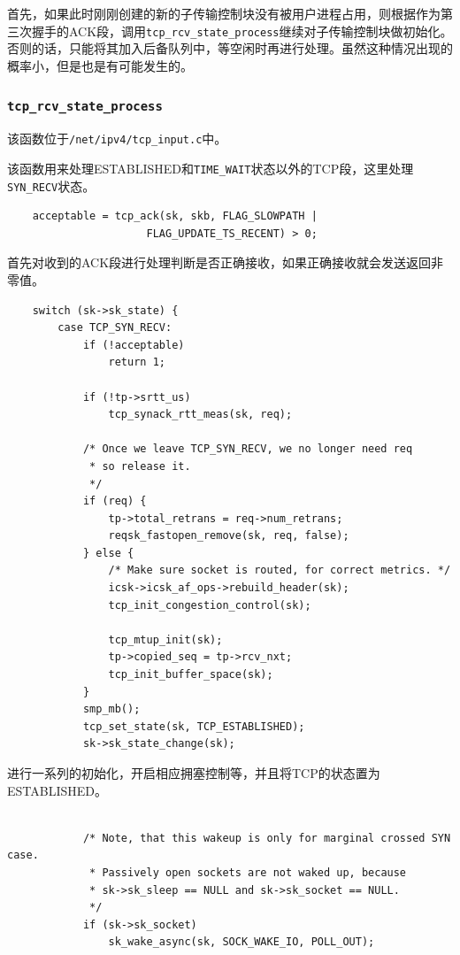                 首先，如果此时刚刚创建的新的子传输控制块没有被用户进程占用，则根据作为第三次握手的ACK段，调用\texttt{tcp_rcv_state_process}继续对子传输控制块做初始化。否则的话，只能将其加入后备队列中，等空闲时再进行处理。虽然这种情况出现的概率小，但是也是有可能发生的。

                \subsubsection{\texttt{tcp_rcv_state_process}}

                    该函数位于\texttt{/net/ipv4/tcp_input.c}中。
                    
                    该函数用来处理ESTABLISHED和\texttt{TIME_WAIT}状态以外的TCP段，这里处理\texttt{SYN_RECV}状态。

\begin{verbatim}
    acceptable = tcp_ack(sk, skb, FLAG_SLOWPATH |
                      FLAG_UPDATE_TS_RECENT) > 0;
\end{verbatim}

                    首先对收到的ACK段进行处理判断是否正确接收，如果正确接收就会发送返回非零值。

\begin{verbatim}
    switch (sk->sk_state) {
        case TCP_SYN_RECV:
            if (!acceptable)
                return 1;

            if (!tp->srtt_us)
                tcp_synack_rtt_meas(sk, req);

            /* Once we leave TCP_SYN_RECV, we no longer need req
             * so release it.
             */
            if (req) {
                tp->total_retrans = req->num_retrans;
                reqsk_fastopen_remove(sk, req, false);
            } else {
                /* Make sure socket is routed, for correct metrics. */
                icsk->icsk_af_ops->rebuild_header(sk);
                tcp_init_congestion_control(sk);

                tcp_mtup_init(sk);
                tp->copied_seq = tp->rcv_nxt;
                tcp_init_buffer_space(sk);
            }
            smp_mb();
            tcp_set_state(sk, TCP_ESTABLISHED);
            sk->sk_state_change(sk);
\end{verbatim}

                    进行一系列的初始化，开启相应拥塞控制等，并且将TCP的状态置为ESTABLISHED。

\begin{verbatim}

            /* Note, that this wakeup is only for marginal crossed SYN case.
             * Passively open sockets are not waked up, because
             * sk->sk_sleep == NULL and sk->sk_socket == NULL.
             */
            if (sk->sk_socket)
                sk_wake_async(sk, SOCK_WAKE_IO, POLL_OUT);
\end{verbatim}

